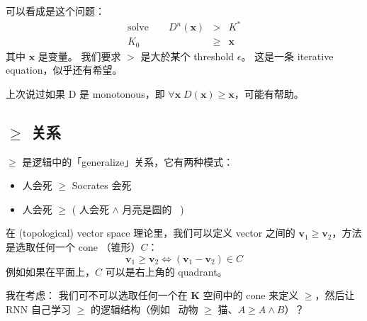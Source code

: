 \documentclass[12pt]{article}
\begin{document}
可以看成是这个问题：
\begin{eqnarray}
\mbox{solve}\quad\quad D^n(\mathbf{x}) & > & K^* \nonumber \\
K_0 & \ge & \mathbf{x}
\end{eqnarray}
其中 $\mathbf{x}$ 是变量。 我们要求 $>$ 是大於某个 threshold $\epsilon$。  这是一条 iterative equation，似乎还有希望。

上次说过如果 D 是 monotonous，即 $\forall \mathbf{x} \; D(\mathbf{x}) \ge \mathbf{x}$，可能有帮助。

\subsection{\texorpdfstring{$\ge$}{>} 关系}

$\ge$ 是逻辑中的「generalize」关系，它有两种模式：
\begin{itemize}
\item 人会死 $\ge$ Socrates 会死
\item 人会死 $\ge$ ( 人会死 $\wedge$ 月亮是圆的 ~)
\end{itemize}

在 (topological) vector space 理论里，我们可以定义 vector 之间的 $\mathbf{v}_1 \ge \mathbf{v}_2$，方法是选取任何一个 cone （锥形）$C$：
$$ \mathbf{v}_1 \ge \mathbf{v}_2 \Leftrightarrow (\mathbf{v}_1 - \mathbf{v}_2) \in C $$
例如如果在平面上，$C$ 可以是右上角的 quadrant。

我在考虑： 我们可不可以选取任何一个在 $\mathbf{K}$ 空间中的 cone 来定义 $\ge$，然后让 RNN 自己学习 $\ge$ 的逻辑结构（例如~ 动物 $\ge $ 猫、$A \ge A \wedge B$）？
\end{document}
